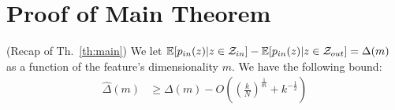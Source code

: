 \section{Proof of Main Theorem}
\label{app:proof}

\begin{theorem} (Recap of Th.~\ref{th:main}) We let $\mathbb{E}[p_{in}(\*z)|{\*z \in \mathcal{Z}_{in}}] - \mathbb{E}[p_{in}(\*z)|{\*z \in \mathcal{Z}_{out}}] = \Delta(m)$ as a function of the feature's dimensionality $m$. We have the following bound:
    \begin{align}
            \hat{\Delta}(m) & \geq \Delta(m) - O((\frac{k}{N})^{\frac{1}{m}} + k^{-\frac{1}{2}})
    \end{align}
\label{th:sup_main}
\end{theorem}

